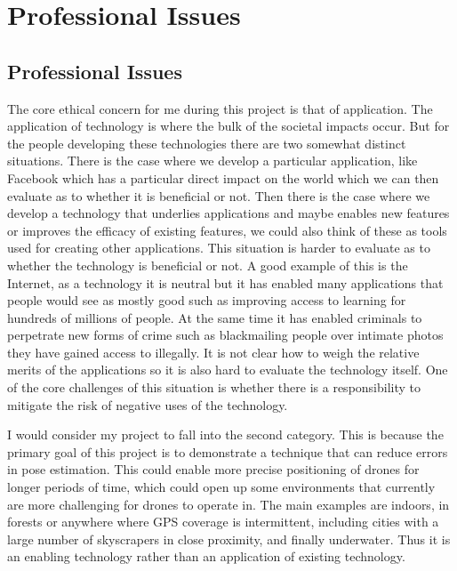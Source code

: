 \documentclass[]{../resources/final_report}
\begin{document}
\chapter{Professional Issues}
\section{Professional Issues}


The core ethical concern for me during this project is that of application.
The application of technology is where the bulk of the societal impacts occur. 
But for the people developing these technologies there are two somewhat distinct situations. 
There is the case where we develop a particular application, like Facebook which has a particular
direct impact on the world which we can then evaluate as to whether it is beneficial or not. 
Then there is the case where we develop a technology that underlies applications and maybe 
enables new features or improves the efficacy of existing features, we could also think of 
these as tools used for creating other applications. This situation is harder to evaluate as 
to whether the technology is beneficial or not. 
A good example of this is the Internet, as a technology it is neutral but it has enabled many 
applications that people would see as mostly good such as improving access to learning for 
hundreds of millions of people. At the same time it has enabled criminals to perpetrate new 
forms of crime such as blackmailing people over intimate photos they have gained access to 
illegally. It is not clear how to weigh the relative merits of the applications so it is also
hard to evaluate the technology itself. One of the core challenges of this situation is whether 
there is a responsibility to mitigate the risk of negative uses of the technology.

I would consider my project to fall into the second category. This is because the primary goal 
of this project is to demonstrate a technique that can reduce errors in pose estimation. This 
could enable more precise positioning of drones for longer periods of time, which could open up 
some environments that currently are more challenging for drones to operate in. The main examples
are indoors, in forests or anywhere where GPS coverage is intermittent, including cities with a 
large number of skyscrapers in close proximity, and finally underwater.
Thus it is an enabling technology rather than an application of existing technology.
\end{document}
